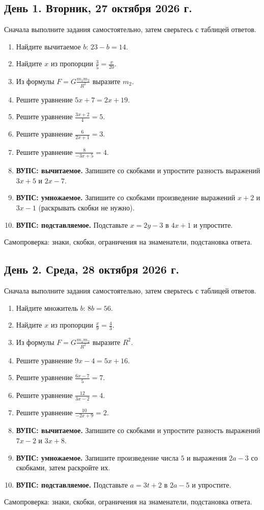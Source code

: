 \documentclass[a4paper,12pt]{article}
\begin{document}
\subsection*{День 1. Вторник, 27 октября 2026 г.}
\textcolor{muted}{Сначала выполните задания самостоятельно, затем сверьтесь с таблицей ответов.}
\begin{enumerate}[label=\arabic*.,leftmargin=1.8em,itemsep=11pt,topsep=7pt]
\item Найдите вычитаемое $b$: $23-b=14$.
\item Найдите $x$ из пропорции $\displaystyle\frac35=\frac{x}{20}$.
\item Из формулы $\displaystyle F=G\frac{m_1m_2}{R^2}$ выразите $m_2$.
\item Решите уравнение $5x+7=2x+19$.
\item Решите уравнение $\displaystyle\frac{3x+2}{4}=5$.
\item Решите уравнение $\displaystyle\frac{6}{2x+1}=3$.
\item Решите уравнение $\displaystyle\frac{8}{-3x+5}=4$.
\item \textbf{ВУПС: вычитаемое.} Запишите со скобками и упростите разность выражений $3x+5$ и $2x-7$.
\item \textbf{ВУПС: умножаемое.} Запишите со скобками произведение выражений $x+2$ и $3x-1$ (раскрывать скобки не нужно).
\item \textbf{ВУПС: подставляемое.} Подставьте $x=2y-3$ в $4x+1$ и упростите.
\end{enumerate}
\vfill\small\textcolor{muted}{Самопроверка: знаки, скобки, ограничения на знаменатели, подстановка ответа.}\normalsize
\clearpage
\subsection*{День 2. Среда, 28 октября 2026 г.}
\textcolor{muted}{Сначала выполните задания самостоятельно, затем сверьтесь с таблицей ответов.}
\begin{enumerate}[label=\arabic*.,leftmargin=1.8em,itemsep=11pt,topsep=7pt]
\item Найдите множитель $b$: $8b=56$.
\item Найдите $x$ из пропорции $\displaystyle\frac{x}{9}=\frac43$.
\item Из формулы $\displaystyle F=G\frac{m_1m_2}{R^2}$ выразите $R^2$.
\item Решите уравнение $9x-4=5x+16$.
\item Решите уравнение $\displaystyle\frac{6x-7}{5}=7$.
\item Решите уравнение $\displaystyle\frac{12}{3x-2}=4$.
\item Решите уравнение $\displaystyle\frac{10}{-2x+9}=2$.
\item \textbf{ВУПС: вычитаемое.} Запишите со скобками и упростите разность выражений $7x-2$ и $3x+8$.
\item \textbf{ВУПС: умножаемое.} Запишите произведение числа $5$ и выражения $2a-3$ со скобками, затем раскройте их.
\item \textbf{ВУПС: подставляемое.} Подставьте $a=3t+2$ в $2a-5$ и упростите.
\end{enumerate}
\vfill\small\textcolor{muted}{Самопроверка: знаки, скобки, ограничения на знаменатели, подстановка ответа.}\normalsize
\clearpage
\end{document}
